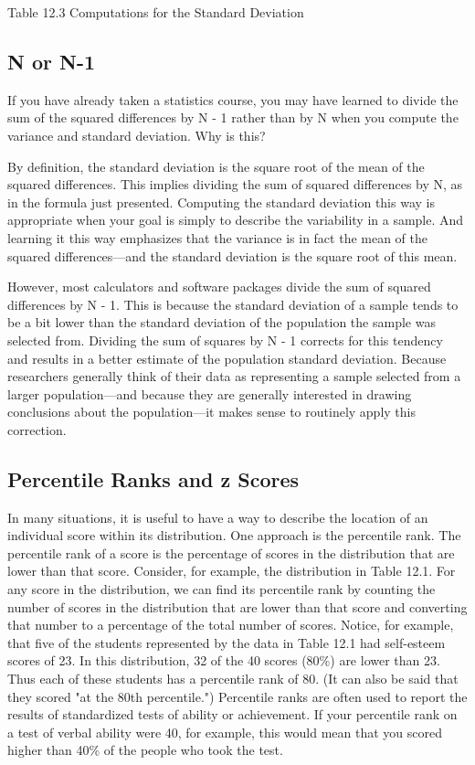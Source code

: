 Table 12.3 Computations for the Standard Deviation
   

\subsection{N or N-1}

If you have already taken a statistics course, you may have learned to divide the sum of the squared differences by N - 1 rather than by N when you compute the variance and standard deviation. Why is this?


By definition, the standard deviation is the square root of the mean of the squared differences. This implies dividing the sum of squared differences by N, as in the formula just presented. Computing the standard deviation this way is appropriate when your goal is simply to describe the variability in a sample. And learning it this way emphasizes that the variance is in fact the mean of the squared differences---and the standard deviation is the square root of this mean.


However, most calculators and software packages divide the sum of squared differences by N - 1. This is because the standard deviation of a sample tends to be a bit lower than the standard deviation of the population the sample was selected from. Dividing the sum of squares by N - 1 corrects for this tendency and results in a better estimate of the population standard deviation. Because researchers generally think of their data as representing a sample selected from a larger population---and because they are generally interested in drawing conclusions about the population---it makes sense to routinely apply this correction.



\subsection{Percentile Ranks and z Scores}

In many situations, it is useful to have a way to describe the location of an individual score within its distribution. One approach is the percentile rank. The percentile rank of a score is the percentage of scores in the distribution that are lower than that score. Consider, for example, the distribution in Table 12.1. For any score in the distribution, we can find its percentile rank by counting the number of scores in the distribution that are lower than that score and converting that number to a percentage of the total number of scores. Notice, for example, that five of the students represented by the data in Table 12.1 had self-esteem scores of 23. In this distribution, 32 of the 40 scores (80\%) are lower than 23. Thus each of these students has a percentile rank of 80. (It can also be said that they scored "at the 80th percentile.") Percentile ranks are often used to report the results of standardized tests of ability or achievement. If your percentile rank on a test of verbal ability were 40, for example, this would mean that you scored higher than 40\% of the people who took the test.


